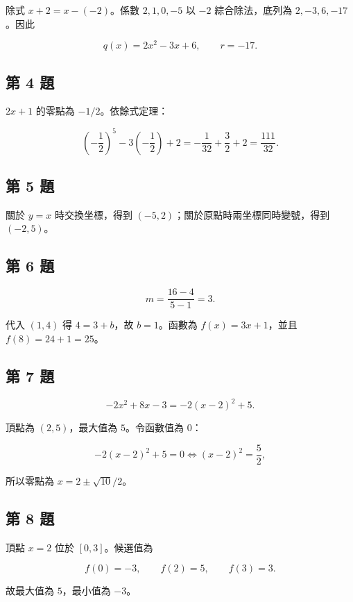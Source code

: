 \documentclass[11pt,a4paper]{article}
\begin{document}
除式 \(x+2=x-(-2)\)。係數 \(2,1,0,-5\) 以 \(-2\) 綜合除法，底列為 \(2,-3,6,-17\)。因此

\[
\boxed{q(x)=2x^2-3x+6,\qquad r=-17}.
\]

\subsection{第 4 題}\label{ux7b2c-4-ux984c}

\(2x+1\) 的零點為 \(-1/2\)。依餘式定理：

\[
\left(-\frac12\right)^5-3\left(-\frac12\right)+2
=-\frac1{32}+\frac32+2
=\boxed{\frac{111}{32}}.
\]

\subsection{第 5 題}\label{ux7b2c-5-ux984c}

關於 \(y=x\) 時交換坐標，得到 \(\boxed{(-5,2)}\)；關於原點時兩坐標同時變號，得到 \(\boxed{(-2,5)}\)。

\subsection{第 6 題}\label{ux7b2c-6-ux984c}

\[
m=\frac{16-4}{5-1}=3.
\]

代入 \((1,4)\) 得 \(4=3+b\)，故 \(b=1\)。函數為 \(\boxed{f(x)=3x+1}\)，並且 \(f(8)=24+1=\boxed{25}\)。

\subsection{第 7 題}\label{ux7b2c-7-ux984c}

\[
-2x^2+8x-3=-2(x-2)^2+5.
\]

頂點為 \((2,5)\)，最大值為 \(5\)。令函數值為 \(0\)：

\[
-2(x-2)^2+5=0
\iff (x-2)^2=\frac52,
\]

所以零點為 \(\boxed{x=2\pm\sqrt{10}/2}\)。

\subsection{第 8 題}\label{ux7b2c-8-ux984c}

頂點 \(x=2\) 位於 \([0,3]\)。候選值為

\[
f(0)=-3,\qquad f(2)=5,\qquad f(3)=3.
\]

故最大值為 \(\boxed5\)，最小值為 \(\boxed{-3}\)。
\end{document}
